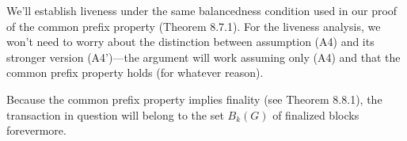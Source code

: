 We’ll establish liveness under the same balancedness condition used in our proof of the
common prefix property (Theorem 8.7.1). For the liveness analysis, we won’t need to worry
about the distinction between assumption (A4) and its stronger version (A4’)—the argument
will work assuming only (A4) and that the common prefix property holds (for whatever
reason).\\

Because the common prefix property implies finality (see Theorem 8.8.1), the transaction in
question will belong to the set $B_k(G)$ of finalized blocks forevermore.\\

